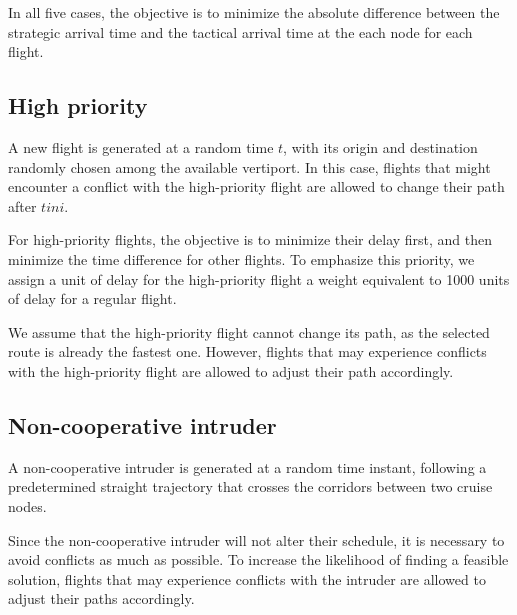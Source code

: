 \documentclass[../thesis.tex]{subfiles}
\begin{document}
In all five cases, the objective is to minimize the absolute difference between the strategic arrival time and the tactical arrival time at the each node for each flight.


\subsection{High priority}

A new flight is generated at a random time $t$, with its origin and destination randomly chosen among the available vertiport.  
In this case, flights that might encounter a conflict with the high-priority flight are allowed to change their path after $tini$.  

For high-priority flights, the objective is to minimize their delay first, and then minimize the time difference for other flights.  
To emphasize this priority, we assign a unit of delay for the high-priority flight a weight equivalent to 1000 units of delay for a regular flight.  

We assume that the high-priority flight cannot change its path, as the selected route is already the fastest one.  
However, flights that may experience conflicts with the high-priority flight are allowed to adjust their path accordingly.

\subsection{Non-cooperative intruder}

A non-cooperative intruder is generated at a random time instant, following a predetermined straight trajectory that crosses the corridors between two cruise nodes.  

Since the non-cooperative intruder will not alter their schedule, it is necessary to avoid conflicts as much as possible.  
To increase the likelihood of finding a feasible solution, flights that may experience conflicts with the intruder are allowed to adjust their paths accordingly.  

\end{document}
